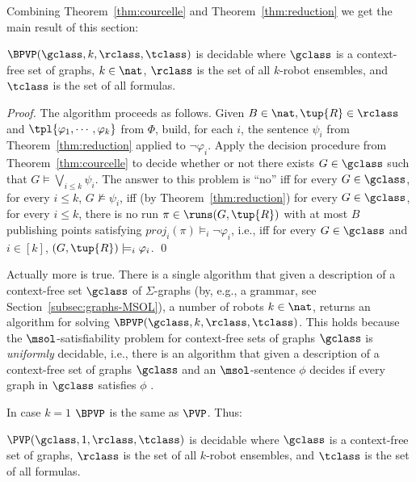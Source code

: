Combining Theorem~\ref{thm:courcelle} and Theorem~\ref{thm:reduction} we get the main result of this section:
\begin{theorem} \label{thm:PVPdec}
$\BPVP({\gclass,k,\rclass,\tclass})$ is decidable where $\gclass$ is a context-free set of graphs, $k \in \nat$, $\rclass$ is the set of all $k$-robot ensembles, and $\tclass$ is the set of all \RLTL formulas.
\end{theorem}
%
\begin{proof}
The algorithm proceeds as follows. Given $B \in \nat,\tup{R} \in \rclass$ and $\tpl{\varphi_1,\cdots,\varphi_k}$ from $\Phi$, build, for each $i$, the sentence $\psi_i$ from Theorem~\ref{thm:reduction} applied to $\neg \varphi_i$. Apply the decision procedure from Theorem~\ref{thm:courcelle} to decide whether or not there exists $G \in \gclass$ such that 
$G \models \bigvee_{i \leq k} \psi_i$. The answer to this problem is ``no'' iff for every $G \in \gclass$, for every $i \leq k$, 
$G \not \models \psi_i$,  iff (by Theorem~\ref{thm:reduction}) for every $G \in \gclass$, for every $i \leq k$, there is no run $\pi \in \runs(G,\tup{R})$ with at most $B$ publishing points satisfying $proj_i(\pi) \models_i \neg \varphi_i$, i.e., 
iff for every $G \in \gclass$ and $i \in [k]$, $(G,\tup{R}) \models_i \varphi_i$.
\qed
\end{proof}

\begin{remark}
 Actually more is true. There is a single algorithm that given  a description of a context-free set $\gclass$ of $\Sigma$-graphs (by, e.g.,  a grammar, see Section~\ref{subsec:graphs-MSOL}), a number of robots $k \in \nat$, returns an algorithm for solving 
 $\BPVP({\gclass,k,\rclass,\tclass})$. This holds because the $\msol$-satisfiability problem for context-free sets of graphs $\gclass$ is \emph{uniformly} decidable, 
 i.e., there is an algorithm that given a description of a context-free set of graphs $\gclass$ and an $\msol$-sentence $\phi$ decides if every graph in $\gclass$ satisfies $\phi$ \cite{CE12}. 
\end{remark}

In case $k = 1$ $\BPVP$ is the same as $\PVP$. Thus:
\begin{corollary} \label{cor:k=1}
 $\PVP({\gclass,1,\rclass,\tclass})$ is decidable where $\gclass$ is a context-free set of graphs, $\rclass$ is the set of all $k$-robot ensembles, and 
 $\tclass$ is the set of all \RLTL formulas.
\end{corollary}


